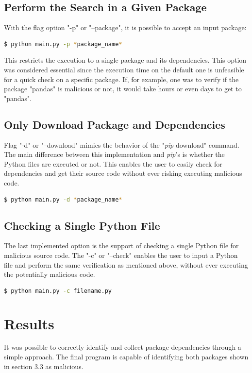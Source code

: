 \subsection{Perform the Search in a Given Package}
With the flag option "-p" or "--package", it is possible to accept an input package:
\bigskip
\begin{lstlisting}[language=bash]
  $ python main.py -p *package_name*
\end{lstlisting}
\bigskip
This restricts the execution to a single package and its dependencies. This option was considered essential since the execution time on the default one is unfeasible for a quick check on a specific package. If, for example, one was to verify if the package "pandas" is malicious or not, it would take hours or even days to get to "pandas".

\subsection{Only Download Package and Dependencies}
Flag "-d" or "--download" mimics the behavior of the "\textit{pip} download" command. The main difference between this implementation and \textit{pip}'s is whether the Python files are executed or not. This enables the user to easily check for dependencies and get their source code without ever risking executing malicious code.
\bigskip
\begin{lstlisting}[language=bash]
  $ python main.py -d *package_name*
\end{lstlisting}
\bigskip

\subsection{Checking a Single Python File}
The last implemented option is the support of checking a single Python file for malicious source code. The "-c" or "--check" enables the user to input a Python file and perform the same verification as mentioned above, without ever executing the potentially malicious code.
\bigskip
\begin{lstlisting}[language=bash]
  $ python main.py -c filename.py
\end{lstlisting}
\bigskip

\section{Results}
It was possible to correctly identify and collect package dependencies through a simple approach. The final program is capable of identifying both packages shown in section 3.3 as malicious.

